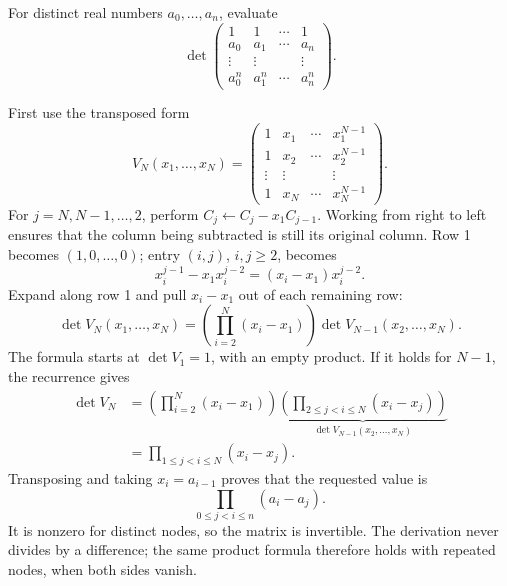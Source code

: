 \begin{example}\label{example:05:vandermonde}
For distinct real numbers \(a_0,\ldots,a_n\), evaluate
\[
\det\begin{pmatrix}
1&1&\cdots&1\\
a_0&a_1&\cdots&a_n\\
\vdots&\vdots&&\vdots\\
a_0^n&a_1^n&\cdots&a_n^n
\end{pmatrix}.
\]
\par\smallskip
{}
First use the transposed form
\[
V_N(x_1,\ldots,x_N)=
\begin{pmatrix}
1&x_1&\cdots&x_1^{N-1}\\
1&x_2&\cdots&x_2^{N-1}\\
\vdots&\vdots&&\vdots\\
1&x_N&\cdots&x_N^{N-1}
\end{pmatrix}.
\]
For \(j=N,N-1,\ldots,2\), perform \(C_j\leftarrow C_j-x_1C_{j-1}\).
Working from right to left ensures that the column being subtracted is
still its original column. Row 1 becomes \((1,0,\ldots,0)\);
entry \((i,j)\), \(i,j\geqslant2\), becomes
\[
x_i^{j-1}-x_1x_i^{j-2}=(x_i-x_1)x_i^{j-2}.
\]
Expand along row 1 and pull \(x_i-x_1\) out of each remaining row:
\[
\det V_N(x_1,\ldots,x_N)
=\left(\prod_{i=2}^N(x_i-x_1)\right)\det V_{N-1}(x_2,\ldots,x_N).
\]
The formula starts at \(\det V_1=1\), with an empty product.
If it holds for \(N-1\), the recurrence gives
\[
\begin{aligned}
\det V_N
&=\left(\prod_{i=2}^N(x_i-x_1)\right)
  \underbrace{\left(\prod_{2\leqslant j<i\leqslant N}(x_i-x_j)\right)}_{\det V_{N-1}(x_2,\ldots,x_N)}\\
&=\prod_{1\leqslant j<i\leqslant N}(x_i-x_j).
\end{aligned}
\]
Transposing and taking \(x_i=a_{i-1}\) proves that the requested value is
\[
\boxed{\displaystyle\prod_{0\leqslant j<i\leqslant n}(a_i-a_j)}.
\]
It is nonzero for distinct nodes, so the matrix is invertible.
The derivation never divides by a difference; the same product formula
therefore holds with repeated nodes, when both sides vanish.
\end{example}
